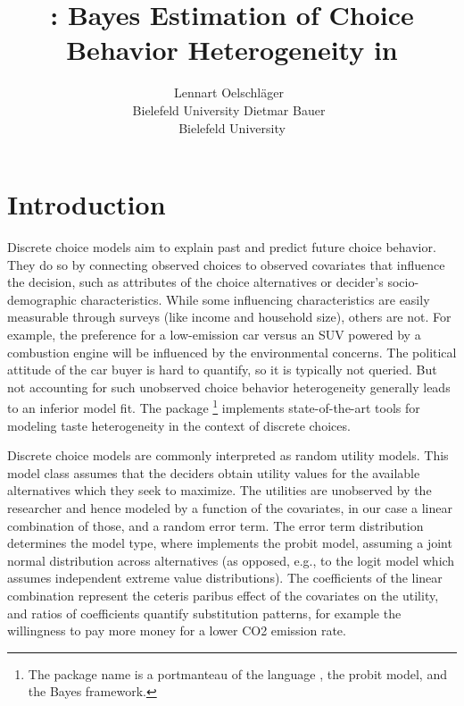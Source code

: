\documentclass[article,shortnames]{jss}
\author{Lennart Oelschl\"ager~\orcidlink{0000-0001-5421-9313}\\Bielefeld University \And Dietmar Bauer~\orcidlink{0000-0003-2920-7032}\\Bielefeld University}
\title{\pkg{RprobitB}: Bayes Estimation of Choice Behavior Heterogeneity in \proglang{R}}
\newcommand{\fct}[1]{\code{#1()}}
\begin{document}


\section{Introduction}
\label{sec:introduction}

Discrete choice models aim to explain past and predict future choice behavior. They do so by connecting observed choices to observed covariates that influence the decision, such as attributes of the choice alternatives or decider's socio-demographic characteristics. While some influencing characteristics are easily measurable through surveys (like income and household size), others are not. For example, the preference for a low-emission car versus an SUV powered by a combustion engine will be influenced by the environmental concerns. The political attitude of the car buyer is hard to quantify, so it is typically not queried. But not accounting for such unobserved choice behavior heterogeneity generally leads to an inferior model fit. The  \citep{R} package \footnote{The package name is a portmanteau of the language , the probit model, and the Bayes framework.} \citep{Oelschlaeger:2022} implements state-of-the-art tools for modeling taste heterogeneity in the context of discrete choices.

Discrete choice models are commonly interpreted as random utility models. This model class assumes that the deciders obtain utility values for the available alternatives which they seek to maximize. The utilities are unobserved by the researcher and hence modeled by a function of the covariates, in our case a linear combination of those, and a random error term. The error term distribution determines the model type, where  implements the probit model, assuming a joint normal distribution across alternatives (as opposed, e.g., to the logit model which assumes independent extreme value distributions). The coefficients of the linear combination represent the ceteris paribus effect of the covariates on the utility, and ratios of coefficients quantify substitution patterns, for example the willingness to pay more money for a lower CO2 emission rate.
\end{document}
